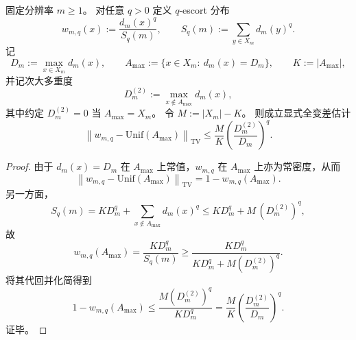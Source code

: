 \begin{proposition}\label{prop:pom-escort-maxfiber-tv-bound}
固定分辨率 \(m\ge 1\)。
对任意 \(q>0\) 定义 \(q\)-escort 分布
\[
w_{m,q}(x):=\frac{d_m(x)^q}{S_q(m)},
\qquad
S_q(m):=\sum_{y\in X_m}d_m(y)^q.
\]
记
\[
D_m:=\max_{x\in X_m}d_m(x),
\qquad
A_{\max}:=\{x\in X_m:\ d_m(x)=D_m\},
\qquad
K:=|A_{\max}|,
\]
并记次大多重度
\[
D_m^{(2)}:=\max_{x\notin A_{\max}}d_m(x),
\]
其中约定 \(D_m^{(2)}=0\) 当 \(A_{\max}=X_m\)。
令 \(M:=|X_m|-K\)。
则成立显式全变差估计
\[
\left\|w_{m,q}-\mathrm{Unif}(A_{\max})\right\|_{\mathrm{TV}}
\le
\frac{M}{K}\left(\frac{D_m^{(2)}}{D_m}\right)^{q}.
\]
\end{proposition}

\begin{proof}
由于 \(d_m(x)=D_m\) 在 \(A_{\max}\) 上常值，\(w_{m,q}\) 在 \(A_{\max}\) 上亦为常密度，从而
\[
\left\|w_{m,q}-\mathrm{Unif}(A_{\max})\right\|_{\mathrm{TV}}
=1-w_{m,q}(A_{\max}).
\]
另一方面，
\[
S_q(m)
=KD_m^q+\sum_{x\notin A_{\max}}d_m(x)^q
\le KD_m^q+M\,(D_m^{(2)})^q,
\]
故
\[
w_{m,q}(A_{\max})
=\frac{KD_m^q}{S_q(m)}
\ge
\frac{KD_m^q}{KD_m^q+M(D_m^{(2)})^q}.
\]
将其代回并化简得到
\[
1-w_{m,q}(A_{\max})
\le
\frac{M(D_m^{(2)})^q}{KD_m^q}
=\frac{M}{K}\left(\frac{D_m^{(2)}}{D_m}\right)^q.
\]
证毕。
\end{proof}

\endinput

